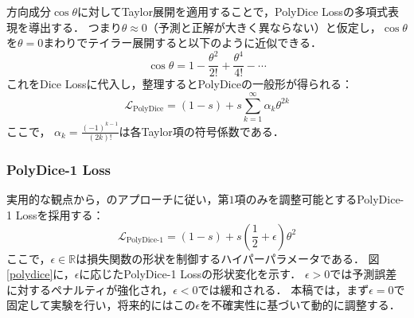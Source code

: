 \documentclass[10pt, a4paper, twocolumn]{jarticle}
\begin{document}
方向成分$\cos \theta$に対してTaylor展開を適用することで，PolyDice Lossの多項式表現を導出する．
つまり$\theta \approx 0$（予測と正解が大きく異ならない）と仮定し，$\cos{\theta}$を$\theta = 0$まわりでテイラー展開すると以下のように近似できる．
\begin{equation}
  \cos{\theta} = 1 - \frac{\theta ^ 2}{2!} + \frac{\theta ^ 4}{4!} - \cdots
\end{equation}
これをDice Lossに代入し，整理するとPolyDiceの一般形が得られる：
\begin{equation}
  \mathcal{L}_{\text{PolyDice}} = (1 - s) + s \sum_{k = 1}^{\infty} \alpha_k \theta ^ {2k}
\end{equation}
ここで， $\alpha_k=\frac{(-1)^{k-1}}{(2k)!}$は各Taylor項の符号係数である．


\subsubsection{PolyDice-1 Loss}
実用的な観点から，\cite{leng2022polyloss}のアプローチに従い，第$1$項のみを調整可能とするPolyDice-1 Lossを採用する：
\begin{equation}
  \mathcal{L}_{\text{PolyDice-1}} = (1 - s) + s \left(\frac{1}{2} + \epsilon\right) \theta^2
\end{equation}
ここで，$\epsilon \in \mathbb{R}$は損失関数の形状を制御するハイパーパラメータである．
図\ref{polydice}に，$\epsilon$に応じたPolyDice-1 Lossの形状変化を示す．
$\epsilon > 0$では予測誤差に対するペナルティが強化され，$\epsilon < 0$では緩和される．
本稿では，まず$\epsilon = 0$で固定して実験を行い，将来的にはこの$\epsilon$を不確実性に基づいて動的に調整する．
\end{document}
